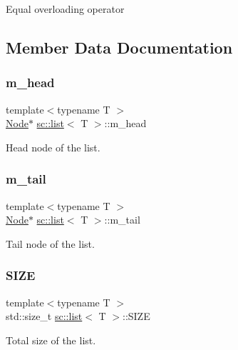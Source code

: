 Equal overloading operator 

\subsection{Member Data Documentation}
\mbox{\label{classsc_1_1list_ae6e1456ccc49b257a34dc075e3bdaf68}} 
\subsubsection{\texorpdfstring{m\+\_\+head}{m\_head}}
{\footnotesize\ttfamily template$<$typename T $>$ \\
\hyperlink{structsc_1_1list_1_1_node}{Node}$\ast$ \hyperlink{classsc_1_1list}{sc\+::list}$<$ T $>$\+::m\+\_\+head\hspace{0.3cm}{\ttfamily [private]}}



Head node of the list. 

\mbox{\label{classsc_1_1list_a5c06e83502191b3a59003a61abef42c7}} 
\subsubsection{\texorpdfstring{m\+\_\+tail}{m\_tail}}
{\footnotesize\ttfamily template$<$typename T $>$ \\
\hyperlink{structsc_1_1list_1_1_node}{Node}$\ast$ \hyperlink{classsc_1_1list}{sc\+::list}$<$ T $>$\+::m\+\_\+tail\hspace{0.3cm}{\ttfamily [private]}}



Tail node of the list. 

\mbox{\label{classsc_1_1list_a8bd70921cedd595d66b9c756576c607d}} 
\subsubsection{\texorpdfstring{S\+I\+ZE}{SIZE}}
{\footnotesize\ttfamily template$<$typename T $>$ \\
std\+::size\+\_\+t \hyperlink{classsc_1_1list}{sc\+::list}$<$ T $>$\+::S\+I\+ZE\hspace{0.3cm}{\ttfamily [private]}}



Total size of the list. 

